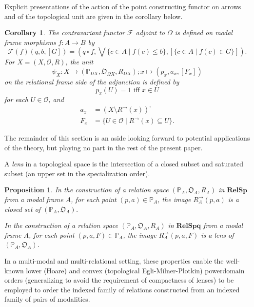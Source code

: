 \documentclass{article}[a4paper]
\newtheorem{proposition}{Proposition}%
\newtheorem{corollary}{Corollary}%
\theoremstyle{definition}
\newcommand{\Fcal}{\mathcal{F}} %
\newcommand{\Ocal}{\mathcal{O}} %
\newcommand{\Ofrak}{\mathfrak{O}} %
\newcommand{\relsp}{\mathbf{RelSp}}
\newcommand{\relspq}{\mathbf{RelSpq}}
\newcommand{\Pbb}{\mathbb{P}}
\newcommand{\dirim}{^{\rightarrow\!}}
\newcommand{\interiorop}[1]{{#1}^\circ}
\begin{document}
Explicit presentations of the action of the point constructing functor on arrows and of the topological unit are given in the 
corollary below. 

\begin{corollary}
\label{result:adjointExplicit}
The contravariant functor 
$\Fcal$
adjoint to $\Omega$ is defined on modal frame morphisms 
$f:A \rightarrow B$ by 
\begin{equation}
\label{pointFunctorOnMorphs}
 \mathcal{F} (f)(q,b,[G]) = 
( q \circ f ,                           \bigvee \{ c \in A \mid f(c) \leq b \} ,  
[\{ c \in A \mid f(c) \in G \} ]). 
\end{equation}
For $X = (X, \Ocal , R)$, the unit 
\begin{equation*}
\psi _X :  X \longrightarrow 
( \Pbb _{\Omega X} , \Ofrak _{\Omega X} , R_{\Omega X}) ; 
x \mapsto 
( p_x , a_x , [F_x] ) 
\end{equation*}
on the relational frame side of the adjunction is defined by 
\begin{equation}
\label{psiXp}
p_x (U) = 1  \mbox{ iff }  x \in U 
\end{equation}
for each $U \in \Ocal$, and 
\begin{align} 
\label{psiXa}
a_x  & =  
\interiorop{(
X \setminus R\dirim(x))
}    \\
\label{psiXF}
F_x  & =  \{ U \in \Ocal \mid R\dirim (x) \subseteq U \} . 
\end{align}
\end{corollary}

The remainder of this section is an aside looking forward to potential applications of the theory, but playing no part in the rest of the present paper.

A \emph{lens} in a topological space is the intersection of a closed subset and saturated subset (an upper set in the specialization order). 
\begin{proposition}
 In the construction of a relation space $(\Pbb_A , \Ofrak_A , R_A)$ in $\relsp$ from a modal frame $A$, for each point $(p,a) \in \Pbb_A$, the image $R_A \dirim (p,a)$ is a closed set of $(\Pbb_A , \Ofrak_A)$.  

In the construction of a relation space $(\Pbb_A , \Ofrak_A , R_A)$ in $\relspq$ from a modal frame $A$, for each point $(p,a,F) \in \Pbb_A$, the image $R_A \dirim (p,a,F)$ is a lens  of $(\Pbb_A , \Ofrak_A)$. 
\end{proposition}
In a multi-modal and multi-relational setting, these properties enable the well-known lower (Hoare) and convex (topological Egli-Milner-Plotkin) powerdomain orders \cite{AbJ} (generalizing to avoid the requirement of compactness of lenses) to be employed to order the indexed family of relations constructed from an indexed family of pairs of modalities. 
\end{document}
